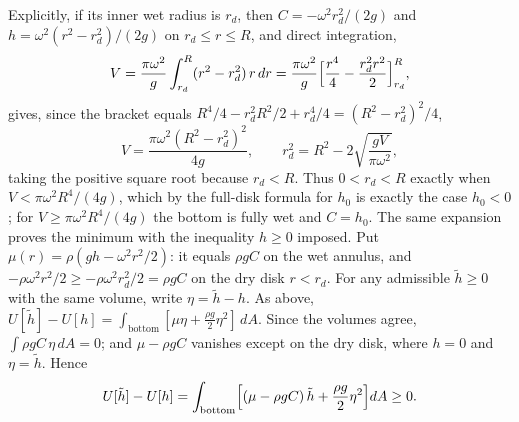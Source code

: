 Explicitly, if its inner wet radius is $r_d$, then
$C=-\omega^2r_d^2/(2g)$ and
$h=\omega^2(r^2-r_d^2)/(2g)$ on $r_d\le r\le R$, and direct integration,
\[
 V=\frac{\pi\omega^2}{g}\int_{r_d}^R(r^2-r_d^2)\,r\,dr
 =\frac{\pi\omega^2}{g}\Bigl[\frac{r^4}4-\frac{r_d^2r^2}2\Bigr]_{r_d}^R,
\]
gives, since the bracket equals
$R^4/4-r_d^2R^2/2+r_d^4/4=(R^2-r_d^2)^2/4$,
\[
 V=\frac{\pi\omega^2(R^2-r_d^2)^2}{4g},\qquad
 r_d^2=R^2-2\sqrt{\frac{gV}{\pi\omega^2}},
\]
taking the positive square root because $r_d<R$. Thus $0<r_d<R$
exactly when $V<\pi\omega^2R^4/(4g)$, which by the full-disk formula
for $h_0$ is exactly the case $h_0<0$; for $V\ge\pi\omega^2R^4/(4g)$
the bottom is fully wet and $C=h_0$.
The same expansion proves the minimum with the inequality $h\ge0$
imposed. Put $\mu(r)=\rho(gh-\omega^2r^2/2)$: it equals $\rho gC$ on
the wet annulus, and $-\rho\omega^2r^2/2\ge-\rho\omega^2r_d^2/2=\rho gC$
on the dry disk $r<r_d$. For any admissible $\tilde h\ge0$ with the
same volume, write $\eta=\tilde h-h$. As above,
$U[\tilde h]-U[h]=\int_{\text{bottom}}[\mu\eta+\frac{\rho g}2\eta^2]\,dA$.
Since the volumes agree, $\int\rho gC\,\eta\,dA=0$; and $\mu-\rho gC$
vanishes except on the dry disk, where $h=0$ and $\eta=\tilde h$. Hence
\[
 U[\tilde h]-U[h]
 =\int_{\text{bottom}}\Bigl[(\mu-\rho gC)\,\tilde h
 +\frac{\rho g}{2}\eta^2\Bigr]dA\ge0.
\]


